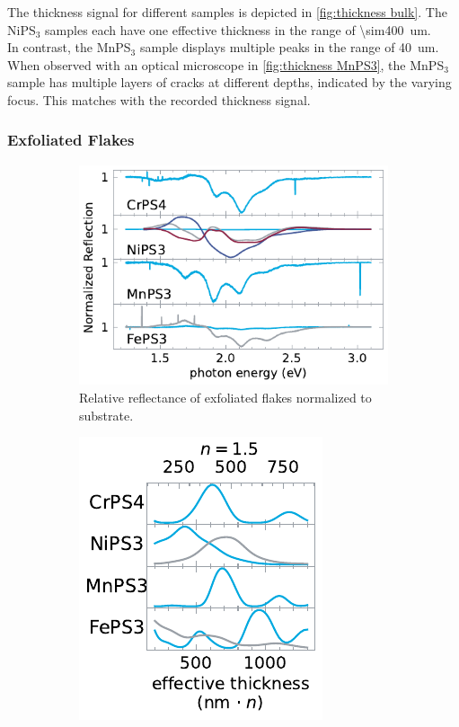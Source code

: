 \documentclass[
	twoside,
	parskip=half,
	a4paper,
]{scrbook}
\begin{document}
The thickness signal for  different samples is depicted in \autoref{fig:thickness bulk}.
The NiPS$_3$ samples each have one effective thickness in the range of \SI{\sim400}{um}.\\
In contrast, the MnPS$_3$ sample displays multiple peaks in the range of \SI{40}{um}.
When observed with an optical microscope in \autoref{fig:thickness MnPS3}, the MnPS$_3$ sample has multiple layers of cracks at different depths, indicated by the varying focus.
This matches with the recorded thickness signal.

\subsubsection*{Exfoliated Flakes}
\begin{figure}
	\centering
	\begin{subfigure}[c]{3.5in}
		\centering
		\includegraphics{../figures/2024-04-10 normalized reflection spectra.pdf}
		\caption{Relative reflectance of exfoliated flakes normalized to substrate.}
		\label{fig:reflection flakes}
	\end{subfigure}
	\begin{subfigure}[c]{2in}
		\centering
		\includegraphics{../figures/2024-03-14 thickness flakes.pdf}

\end{subfigure}
\end{figure}
\end{document}
